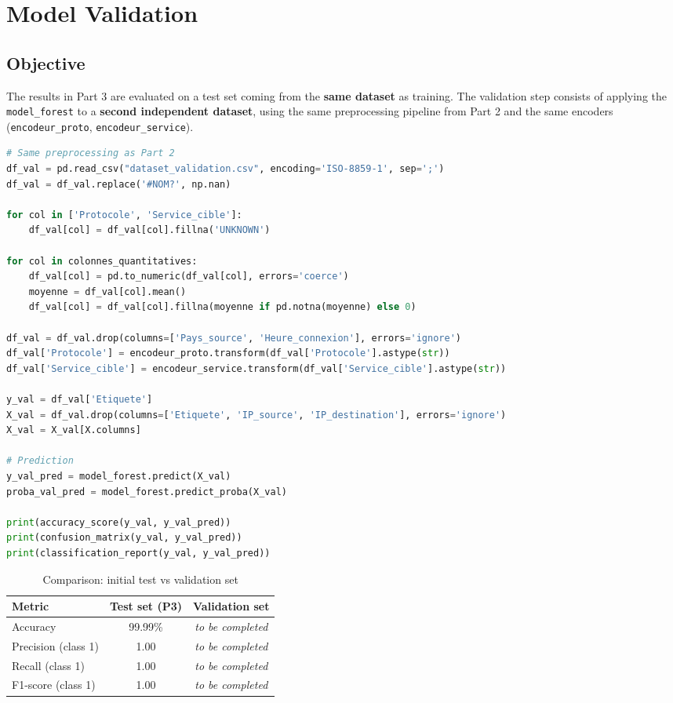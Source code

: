 \chapter{Model Validation}

\section{Objective}

The results in Part 3 are evaluated on a test set coming from the \textbf{same dataset} as training. The validation step consists of applying the \texttt{model\_forest} to a \textbf{second independent dataset}, using the same preprocessing pipeline from Part 2 and the same encoders (\texttt{encodeur\_proto}, \texttt{encodeur\_service}).

\begin{lstlisting}[language=Python]
# Same preprocessing as Part 2
df_val = pd.read_csv("dataset_validation.csv", encoding='ISO-8859-1', sep=';')
df_val = df_val.replace('#NOM?', np.nan)

for col in ['Protocole', 'Service_cible']:
    df_val[col] = df_val[col].fillna('UNKNOWN')

for col in colonnes_quantitatives:
    df_val[col] = pd.to_numeric(df_val[col], errors='coerce')
    moyenne = df_val[col].mean()
    df_val[col] = df_val[col].fillna(moyenne if pd.notna(moyenne) else 0)

df_val = df_val.drop(columns=['Pays_source', 'Heure_connexion'], errors='ignore')
df_val['Protocole'] = encodeur_proto.transform(df_val['Protocole'].astype(str))
df_val['Service_cible'] = encodeur_service.transform(df_val['Service_cible'].astype(str))

y_val = df_val['Etiquete']
X_val = df_val.drop(columns=['Etiquete', 'IP_source', 'IP_destination'], errors='ignore')
X_val = X_val[X.columns]

# Prediction
y_val_pred = model_forest.predict(X_val)
proba_val_pred = model_forest.predict_proba(X_val)

print(accuracy_score(y_val, y_val_pred))
print(confusion_matrix(y_val, y_val_pred))
print(classification_report(y_val, y_val_pred))
\end{lstlisting}

\begin{table}[H]
\centering
\caption{Comparison: initial test vs validation set}
\begin{tabular}{lcc}
\toprule
\textbf{Metric} & \textbf{Test set (P3)} & \textbf{Validation set} \\
\midrule
Accuracy & 99.99\% & \textit{to be completed} \\
Precision (class 1) & 1.00 & \textit{to be completed} \\
Recall (class 1) & 1.00 & \textit{to be completed} \\
F1-score (class 1) & 1.00 & \textit{to be completed} \\
\bottomrule
\end{tabular}
\end{table}

